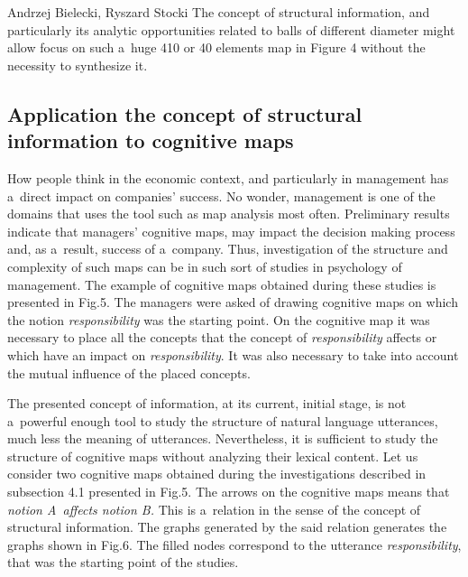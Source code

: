 \begin{artengenv2auth}{Andrzej Bielecki, Ryszard Stocki}
The concept of structural information, and particularly its analytic opportunities related to balls of different diameter might allow focus on such a~huge 410 
\parencite[][]{iasiello_whats_2023} %
 or 40 elements map in Figure 4 without the necessity to synthesize it.



\subsection{Application the concept of structural information to cognitive maps}



How people think in the economic context, and particularly in management has a~direct impact on companies' success. No wonder, management is one of the domains that uses the tool such as map analysis most often. Preliminary results indicate that managers' cognitive maps, may impact the decision making process and, as a~result, success of a~company. Thus, investigation of the structure and complexity of such maps can be in such sort of studies in psychology of management. The example of cognitive maps obtained during these studies is presented in Fig.5. The managers were asked of drawing cognitive maps on which the notion \textit{responsibility} was the starting point. On the cognitive map it was necessary to place all the concepts that the concept of \textit{responsibility} affects or which have an impact on \textit{responsibility}. It was also necessary to take into account the mutual influence of the placed concepts.



The presented concept of information, at its current, initial stage, is not a~powerful enough tool to study the structure of natural language utterances, much less the meaning of utterances. Nevertheless, it is sufficient to study the structure of cognitive maps without analyzing their lexical content. Let us consider two cognitive maps obtained during the investigations described in subsection 4.1 presented in Fig.5. The arrows on the cognitive maps means that \textit{notion A~affects notion B.} This is a~relation in the sense of the concept of structural information. The graphs generated by the said relation generates the graphs shown in Fig.6. The filled nodes correspond to the utterance \textit{responsibility}, that was the starting point of the studies.

\begin{figure}[htbp]
\begin{adjustwidth}{-.1\textwidth}{}
  \begin{minipage}{.5\linewidth}
    \centering
  \begin{tikzpicture}[scale=0.6, transform shape,
   centernode/.style={ellipse, align=center, minimum width=2cm},
        mynode/.style={draw, align=center, rounded corners, minimum width=1cm, minimum height=0.5cm},
        myarrow/.style={<-, >=latex, thick},
        node distance=1cm and 2cm
    ]
    

\end{tikzpicture}
\end{minipage}
\end{adjustwidth}
\end{figure}
\end{artengenv2auth}

